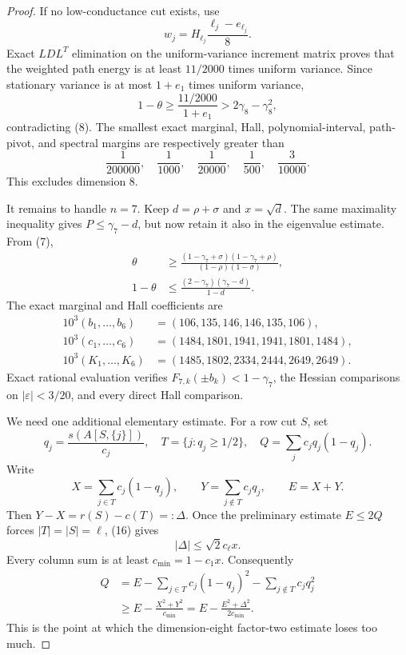 \documentclass[10pt,a4paper]{amsart}
\theoremstyle{definition}
\theoremstyle{remark}
\begin{document}
\begin{proof}
If no low-conductance cut exists, use
\[
w_j=H_{\ell_j}\frac{\ell_j-e_{\ell_j}}8.
\]
Exact \(LDL^T\) elimination on the uniform-variance increment matrix proves
that the weighted path energy is at least \(11/2000\) times uniform
variance. Since stationary variance is at most \(1+e_1\) times uniform
variance,
\[
1-\theta\geq\frac{11/2000}{1+e_1}
>2\gamma_8-\gamma_8^2,
\]
contradicting (8). The smallest exact marginal, Hall, polynomial-interval,
path-pivot, and spectral margins are respectively greater than
\[
\frac1{200000},\quad\frac1{1000},\quad
\frac1{20000},\quad\frac1{500},\quad
\frac3{10000}.
\]
This excludes dimension \(8\).

It remains to handle \(n=7\). Keep \(d=\rho+\sigma\) and \(x=\sqrt d\).
The same maximality inequality gives \(P\leq\gamma_7-d\), but now retain it
also in the eigenvalue estimate. From (7),
\[
\begin{split}
\theta&\geq
\frac{(1-\gamma_7+\sigma)(1-\gamma_7+\rho)}
     {(1-\rho)(1-\sigma)},\\
1-\theta&\leq
\frac{(2-\gamma_7)(\gamma_7-d)}{1-d}.
\end{split}                                         \tag{15}
\]
The exact marginal and Hall coefficients are
\[
\begin{split}
10^3(b_1,\ldots,b_6)&=(106,135,146,146,135,106),\\
10^3(c_1,\ldots,c_6)&=(1484,1801,1941,1941,1801,1484),\\
10^3(K_1,\ldots,K_6)&=(1485,1802,2334,2444,2649,2649).
\end{split}                                         \tag{16}
\]
Exact rational evaluation verifies \(F_{7,k}(\pm b_k)<1-\gamma_7\), the Hessian
comparisons on \(|\varepsilon|<3/20\), and every direct Hall comparison.

We need one additional elementary estimate. For a row cut \(S\), set
\[
 q_j=\frac{s(A[S,\{j\}])}{c_j},\quad
 T=\{j:q_j\geq1/2\},\quad
 Q=\sum_jc_jq_j(1-q_j).
\]
Write
\[
 X=\sum_{j\in T}c_j(1-q_j),\qquad
 Y=\sum_{j\notin T}c_jq_j,\qquad E=X+Y.
\]
Then \(Y-X=r(S)-c(T)=:\Delta\). Once the preliminary estimate
\(E\leq2Q\) forces \(|T|=|S|=\ell\), (16) gives
\[
 |\Delta|\leq\sqrt2c_\ell x.
\]
Every column sum is at least \(c_{\min}=1-c_1x\). Consequently
\[
\begin{split}
Q
&=E-\sum_{j\in T}c_j(1-q_j)^2
     -\sum_{j\notin T}c_jq_j^2\\
&\geq E-\frac{X^2+Y^2}{c_{\min}}
 =E-\frac{E^2+\Delta^2}{2c_{\min}}.
\end{split}                                         \tag{17}
\]
This is the point at which the dimension-eight factor-two estimate loses
too much.


\end{proof}
\end{document}
